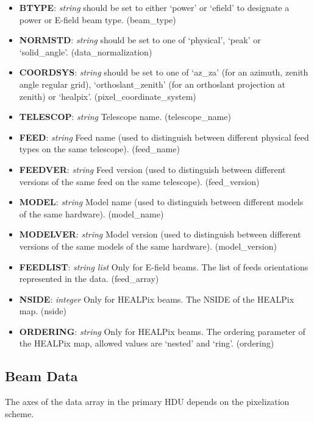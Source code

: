 \documentclass[11pt, oneside]{article}   	%
\begin{document}
\begin{itemize}
\item{\textbf{BTYPE}: \textit{string} should be set to either `power' or `efield' to designate a power or E-field beam type. (beam\_type)}
\item{\textbf{NORMSTD}: \textit{string} should be set to one of `physical', `peak' or `solid\_angle'. (data\_normalization)}
\item{\textbf{COORDSYS}: \textit{string} should be set to one of `az\_za' (for an azimuth, zenith angle regular grid), `orthoslant\_zenith' (for an orthoslant projection at zenith) or `healpix'. (pixel\_coordinate\_system)}
\item{\textbf{TELESCOP}: \textit{string} Telescope name. (telescope\_name)}
\item{\textbf{FEED}: \textit{string} Feed name (used to distinguish between different physical feed types on the same telescope). (feed\_name)}
\item{\textbf{FEEDVER}: \textit{string} Feed version (used to distinguish between different versions of the same feed on the same telescope). (feed\_version)}
\item{\textbf{MODEL}: \textit{string} Model name  (used to distinguish between different models of the same hardware). (model\_name)}
\item{\textbf{MODELVER}: \textit{string} Model version (used to distinguish between different versions of the same models of the same hardware). (model\_version)}
\item{\textbf{FEEDLIST}: \textit{string list} Only for E-field beams. The list of feeds orientations represented in the data. (feed\_array)}
\item{\textbf{NSIDE}: \textit{integer} Only for HEALPix beams. The NSIDE of the HEALPix map. (nside)}
\item{\textbf{ORDERING}: \textit{string} Only for HEALPix beams. The ordering parameter of the HEALPix map, allowed values are `nested' and `ring'. (ordering)}
\end{itemize}

\subsection{Beam Data}
The axes of the data array in the primary HDU depends on the pixelization scheme.
\end{document}
